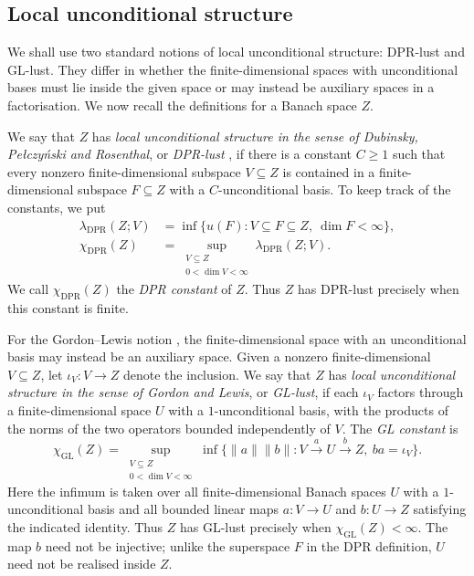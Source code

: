 \documentclass[11pt,a4paper,reqno]{amsart}
\theoremstyle{definition}
\newcommand{\norm}[1]{\lVert #1\rVert}
\numberwithin{equation}{section}
\begin{document}
\subsection{Local unconditional structure}\label{subsec:local-unconditional}
We shall use two standard notions of local unconditional structure: DPR-lust and GL-lust. They differ in whether the finite-dimensional spaces with unconditional bases must lie inside the given space or may instead be auxiliary spaces in a factorisation. We now recall the definitions for a Banach space $Z$.

We say that $Z$ has \emph{local unconditional structure in the sense of Dubinsky, Pe\l czy\'nski and Rosenthal}, or \emph{DPR-lust} \cite{DubinskyPelczynskiRosenthal1972}, if there is a constant $C\geq1$ such that every nonzero finite-dimensional subspace $V\subseteq Z$ is contained in a finite-dimensional subspace $F\subseteq Z$ with a $C$-unconditional basis. To keep track of the constants, we put
\begin{equation*}
\begin{aligned}
 \lambda_{\mathrm{DPR}}(Z;V)
   &=\inf\{u(F):V\subseteq F\subseteq Z,\ \dim F<\infty\},\\
 \chi_{\mathrm{DPR}}(Z)
   &=\sup_{\substack{V\subseteq Z\\0<\dim V<\infty}}
          \lambda_{\mathrm{DPR}}(Z;V).
\end{aligned}
\end{equation*}
We call $\chi_{\mathrm{DPR}}(Z)$ the \emph{DPR constant} of $Z$. Thus $Z$ has DPR-lust precisely when this constant is finite.

For the Gordon--Lewis notion \cite{GordonLewis1974}, the finite-dimensional space with an unconditional basis may instead be an auxiliary space. Given a nonzero finite-dimensional $V\subseteq Z$, let $\iota_V\colon V\to Z$ denote the inclusion. We say that $Z$ has \emph{local unconditional structure in the sense of Gordon and Lewis}, or \emph{GL-lust}, if each $\iota_V$ factors through a finite-dimensional space $U$ with a $1$-unconditional basis, with the products of the norms of the two operators bounded independently of $V$. The \emph{GL constant} is
\begin{equation*}
 \chi_{\mathrm{GL}}(Z)
 =\sup_{\substack{V\subseteq Z\\0<\dim V<\infty}}
 \inf\{\norm a\norm b:
       V\xrightarrow{a}U\xrightarrow{b}Z,\ ba=\iota_V\}.
\end{equation*}
Here the infimum is taken over all finite-dimensional Banach spaces $U$ with a $1$-unconditional basis and all bounded linear maps $a\colon V\to U$ and $b\colon U\to Z$ satisfying the indicated identity. Thus $Z$ has GL-lust precisely when $\chi_{\mathrm{GL}}(Z)<\infty$. The map $b$ need not be injective; unlike the superspace $F$ in the DPR definition, $U$ need not be realised inside $Z$.
\end{document}

